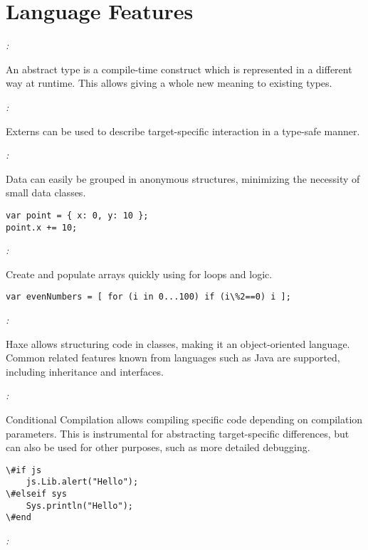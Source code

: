 \chapter{Language Features}
\label{lf}

\emph{:}

An abstract type is a compile-time construct which is represented in a different way at runtime. This allows giving a whole new meaning to existing types.

\emph{:}

Externs can be used to describe target-specific interaction in a type-safe manner.

\emph{:}

Data can easily be grouped in anonymous structures, minimizing the necessity of small data classes.

\begin{lstlisting}
var point = { x: 0, y: 10 };
point.x += 10;
\end{lstlisting}

\emph{:}

Create and populate arrays quickly using for loops and logic.

\begin{lstlisting}
var evenNumbers = [ for (i in 0...100) if (i\%2==0) i ];
\end{lstlisting}

\emph{:}

Haxe allows structuring code in classes, making it an object-oriented language. Common related features known from languages such as Java are supported, including inheritance and interfaces.

\emph{:}

Conditional Compilation allows compiling specific code depending on compilation parameters. This is instrumental for abstracting target-specific differences, but can also be used for other purposes, such as more detailed debugging.

\begin{lstlisting}
\#if js
    js.Lib.alert("Hello");
\#elseif sys
    Sys.println("Hello");
\#end
\end{lstlisting}

\emph{:}

